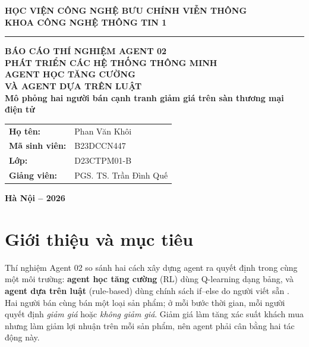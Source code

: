 \documentclass[12pt,a4paper]{report}
\begin{document}
\hypersetup{pageanchor=false}
\begin{titlepage}
\thispagestyle{empty}
\begin{center}
\vspace*{0.7cm}
{\bfseries\fontsize{16}{20}\selectfont HỌC VIỆN CÔNG NGHỆ BƯU CHÍNH VIỄN THÔNG}\\[0.15cm]
{\bfseries\fontsize{15}{19}\selectfont KHOA CÔNG NGHỆ THÔNG TIN 1}\\[0.3cm]
\rule{5cm}{0.5pt}
\vspace{2.2cm}

{\bfseries\fontsize{18}{24}\selectfont BÁO CÁO THÍ NGHIỆM AGENT 02}\\[0.35cm]
{\bfseries\fontsize{17}{23}\selectfont PHÁT TRIỂN CÁC HỆ THỐNG THÔNG MINH}\\[0.7cm]
{\bfseries\color{reportblue}\fontsize{21}{27}\selectfont AGENT HỌC TĂNG CƯỜNG\\[0.15cm]
VÀ AGENT DỰA TRÊN LUẬT}\\[0.3cm]
{\bfseries\fontsize{15}{20}\selectfont Mô phỏng hai người bán cạnh tranh giảm giá trên sàn thương mại điện tử}

\vspace{2.0cm}
\begin{tabular}{>{\bfseries}p{4.1cm}p{6.5cm}}
Họ tên: & Phan Văn Khôi \\
Mã sinh viên: & B23DCCN447 \\
Lớp: & D23CTPM01-B \\
Giảng viên: & PGS. TS. Trần Đình Quế \\
\end{tabular}
\vfill
{\bfseries\fontsize{14}{18}\selectfont Hà Nội -- 2026}
\end{center}
\end{titlepage}
\hypersetup{pageanchor=true}
\tableofcontents
\clearpage
\listoftables
\listoffigures
\clearpage
{}

\chapter{Giới thiệu và mục tiêu}
\label{chap:intro}

Thí nghiệm Agent 02 so sánh hai cách xây dựng agent ra quyết định trong cùng một
môi trường: \textbf{agent học tăng cường} (RL) dùng Q-learning dạng bảng, và
\textbf{agent dựa trên luật} (rule-based) dùng chính sách if--else do người viết sẵn
\cite{assignment,complementary}. Hai người bán cùng bán một loại sản phẩm; ở mỗi bước
thời gian, mỗi người quyết định \emph{giảm giá} hoặc \emph{không giảm giá}. Giảm giá
làm tăng xác suất khách mua nhưng làm giảm lợi nhuận trên mỗi sản phẩm, nên agent
phải cân bằng hai tác động này.
\end{document}
